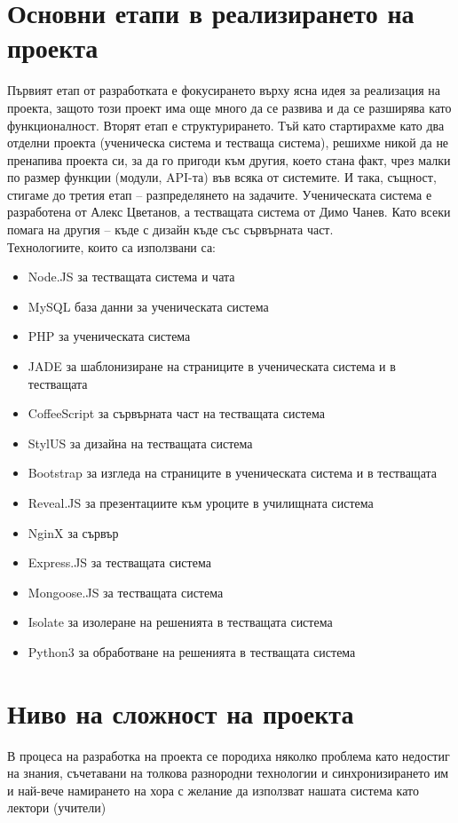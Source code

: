 \documentclass[12pt]{article}
\begin{document}
	\section{Основни етапи в реализирането на проекта}
	Първият етап от разработката е фокусирането върху ясна идея за реализация на проекта, защото този проект има още много да се развива и да се разширява като функционалност. 
	Вторят етап е структурирането.  Тъй като стартирахме като два отделни проекта (ученическа система и тестваща система), решихме никой да не пренапива проекта си, за да го пригоди към другия, което стана факт, чрез малки по размер функции (модули, API-та) във всяка от системите. 
	И така, същност, стигаме до третия етап – разпределянето на задачите. Ученическата система е разработена от Алекс Цветанов, а тестващата система от Димо Чанев. Като всеки помага на другия – къде с дизайн къде със сървърната част. \\
	Технологиите, които са използвани са:
	\begin{itemize}
		\item Node.JS за тестващата система и чата
		\item MySQL база данни за ученическата система
		\item PHP за ученическата система
		\item JADE за шаблонизиране на страниците в ученическата система и в тестващата
		\item CoffeeScript за сървърната част на тестващата система
		\item StylUS за дизайна на тестващата система
		\item Bootstrap за изгледа на страниците в ученическата система и в тестващата
		\item Reveal.JS за презентациите към уроците в училищната система
		\item NginX за сървър
		\item Express.JS за тестващата система
		\item Mongoose.JS за тестващата система
		\item Isolate за изолеране на решенията в тестващата система
		\item Python3 за обработване на решенията в тестващата система
	\end{itemize}
	\section{Ниво на сложност на проекта}
	В процеса на разработка на проекта се породиха няколко проблема като недостиг на знания, съчетавани на толкова разнородни технологии и синхронизирането им и най-вече намирането на хора с желание да използват нашата система като лектори (учители)
\end{document}
